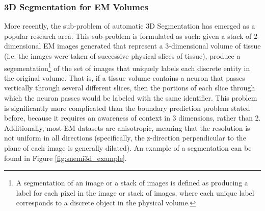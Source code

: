 \medskip

\subsubsection*{3D Segmentation for EM Volumes}

More recently, the sub-problem of automatic 3D Segmentation has emerged as a popular research area. This sub-problem is formulated as such: given a stack of 2-dimensional EM images generated that represent a 3-dimensional volume of tissue (i.e. the images were taken of successive physical slices of tissue), produce a segementation\footnote{A segmentation of an image or a stack of images is defined as producing a label for each pixel in the image or stack of images, where each unique label corresponds to a discrete object in the physical volume.} of the set of images that uniquely labels each discrete entity in the original volume. That is, if a tissue volume contains a neuron that passes vertically through several different slices, then the portions of each slice through which the neuron passes would be labeled with the same identifier. This problem is significantly more complicated than the boundary prediction problem stated before, because it requires an awareness of context in 3 dimensions, rather than 2. Additionally, most EM datasets are anisotropic, meaning that the resolution is not uniform in all directions (specifically, the z-direction perpendicular to the plane of each image is generally dilated). An example of a segmentation can be found in Figure \ref{fig:snemi3d_example}.

